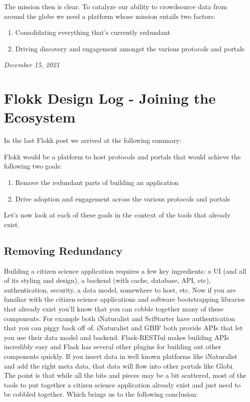 \documentclass[10pt,a5paper]{book}
\begin{document}
The mission then is clear. To catalyze our ability to crowdsource data from around the globe we need a platform whose mission entails two factors:

\begin{enumerate}
\item Consolidating everything that’s currently redundant
\item Driving discovery and engagement amongst the various protocols and portals
\end{enumerate}


\textit{December 15, 2021}

\section{Flokk Design Log - Joining the Ecosystem}
In the last Flokk post we arrived at the following summary:


Flokk would be a platform to host protocols and portals that would achieve the following two goals:
\begin{enumerate}
\item Remove the redundant parts of building an application
\item Drive adoption and engagement across the various protocols and portals
\end{enumerate}

Let's now look at each of these goals in the context of the tools that already exist.

\subsection{Removing Redundancy}
Building a citizen science application requires a few key ingredients: a UI (and all of its styling and design), a backend (with cache, database, API, etc), authentication, security, a data model, somewhere to host, etc. Now if you are familiar with the citizen science applications and software bootstrapping libraries that already exist you'll know that you can cobble together many of these components. For example both iNaturalist and SciStarter have authentication that you can piggy back off of. iNaturalist and GBIF both provide APIs that let you use their data model and backend. Flask-RESTful makes building APIs incredibly easy and Flask has several other plugins for building out other components quickly. If you insert data in well known platforms like iNaturalist and add the right meta data, that data will flow into other portals like Globi. The point is that while all the bits and pieces may be a bit scattered, most of the tools to put together a citizen science application already exist and just need to be cobbled together. Which brings us to the following conclusion:\linebreak
\end{document}
